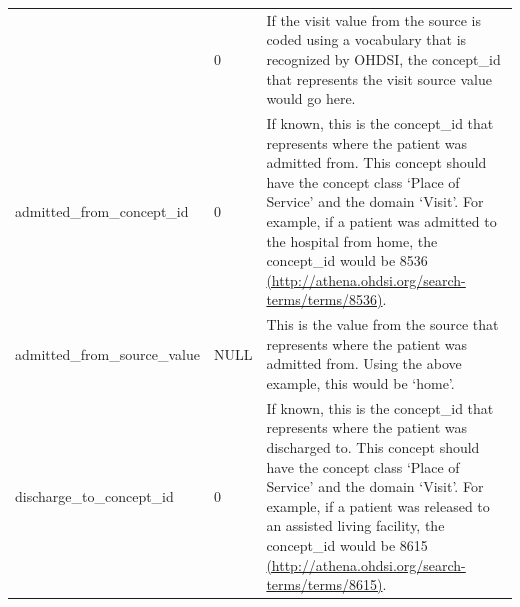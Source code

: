\documentclass[]{book}
\begin{document}
\begin{longtable}[]{@{}lll@{}}
\begin{minipage}[t]{0.25\columnwidth}
\end{minipage} & \begin{minipage}[t]{0.17\columnwidth}\raggedright
0\strut
\end{minipage} & \begin{minipage}[t]{0.50\columnwidth}\raggedright
If the visit value from the source is coded using a vocabulary that is recognized by OHDSI, the concept\_id that represents the visit source value would go here.\strut
\end{minipage}\tabularnewline
\begin{minipage}[t]{0.25\columnwidth}\raggedright
admitted\_from\_concept\_id\strut
\end{minipage} & \begin{minipage}[t]{0.17\columnwidth}\raggedright
0\strut
\end{minipage} & \begin{minipage}[t]{0.50\columnwidth}\raggedright
If known, this is the concept\_id that represents where the patient was admitted from. This concept should have the concept class `Place of Service' and the domain `Visit'. For example, if a patient was admitted to the hospital from home, the concept\_id would be 8536 \href{http://athena.ohdsi.org/search-terms/terms/8536}{(http://athena.ohdsi.org/search-terms/terms/8536)}.\strut
\end{minipage}\tabularnewline
\begin{minipage}[t]{0.25\columnwidth}\raggedright
admitted\_from\_source\_value\strut
\end{minipage} & \begin{minipage}[t]{0.17\columnwidth}\raggedright
NULL\strut
\end{minipage} & \begin{minipage}[t]{0.50\columnwidth}\raggedright
This is the value from the source that represents where the patient was admitted from. Using the above example, this would be `home'.\strut
\end{minipage}\tabularnewline
\begin{minipage}[t]{0.25\columnwidth}\raggedright
discharge\_to\_concept\_id\strut
\end{minipage} & \begin{minipage}[t]{0.17\columnwidth}\raggedright
0\strut
\end{minipage} & \begin{minipage}[t]{0.50\columnwidth}\raggedright
If known, this is the concept\_id that represents where the patient was discharged to. This concept should have the concept class `Place of Service' and the domain `Visit'. For example, if a patient was released to an assisted living facility, the concept\_id would be 8615 \href{http://athena.ohdsi.org/search-terms/terms/8615}{(http://athena.ohdsi.org/search-terms/terms/8615)}.\strut

\end{minipage}
\end{longtable}
\end{document}
